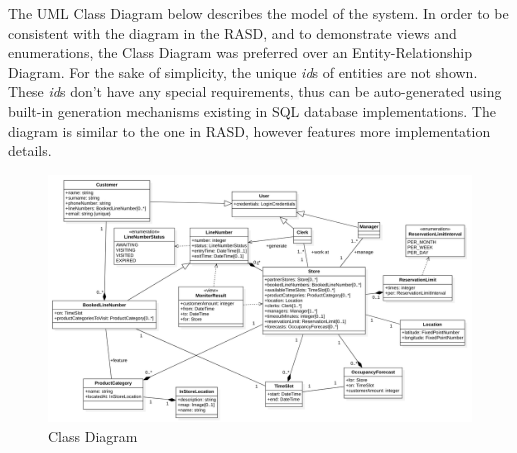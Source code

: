 The UML Class Diagram below describes the model of the system.
In order to be consistent with the diagram in the RASD, and to demonstrate views and enumerations, the Class Diagram was preferred over an Entity-Relationship Diagram.
For the sake of simplicity, the unique \textit{id}s of entities are not shown.
These \textit{id}s don't have any special requirements, thus can be auto-generated using built-in generation mechanisms existing in SQL database implementations.
The diagram is similar to the one in RASD, however features more implementation details.

\begin{figure}[H]
    \centering
    \includegraphics[height=0.4\textwidth]{Images/ClassDiagram.png}
    \caption{Class Diagram}
    \label{fig:ClassDiagram}
\end{figure}

